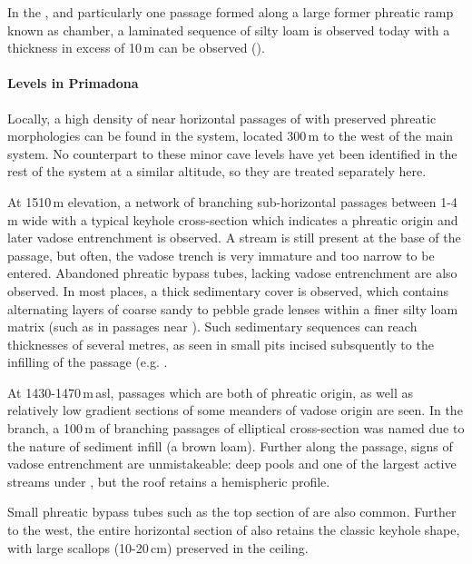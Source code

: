 In the , and particularly one passage formed along a large former phreatic ramp known as  chamber, a laminated sequence of silty loam is observed today with a thickness in excess of 10\,m can be observed ().

\paragraph{Levels in Primadona}

Locally, a high density of near horizontal passages of with preserved phreatic morphologies can be found in the  system, located 300\,m to the west of the main system. 
No counterpart to these minor cave levels have yet been identified in the rest of the system at a similar altitude, so they are treated separately here.

At 1510\,m elevation, a network of branching sub-horizontal passages between 1-4 m wide with a typical keyhole cross-section which indicates a phreatic origin and later vadose entrenchment is observed. 
A stream is still present at the base of the passage, but often, the vadose trench is very immature and too narrow to be entered. 
Abandoned phreatic bypass tubes, lacking vadose entrenchment are also observed. 
In most places, a thick sedimentary cover is observed, which contains alternating layers of coarse sandy to pebble grade lenses within a finer silty loam matrix (such as in passages near ). 
Such sedimentary sequences can reach thicknesses of several metres, as seen in small pits incised subsquently to the infilling of the passage (e.g. .  

At 1430-1470\,m\,asl, passages which are both of phreatic origin, as well as relatively low gradient sections of some meanders of vadose origin are seen.
In the  branch,  a 100\,m of branching passages of elliptical cross-section was named  due to the nature of sediment infill (a brown loam). 
Further along the passage, signs of vadose entrenchment are unmistakeable: deep pools and one of the largest active streams under , but the roof retains a hemispheric profile.

Small phreatic bypass tubes such as the top section of  are also common. 
Further to the west, the entire horizontal section of  also retains the classic keyhole shape, with large scallops (10-20\,cm) preserved in the ceiling. 

